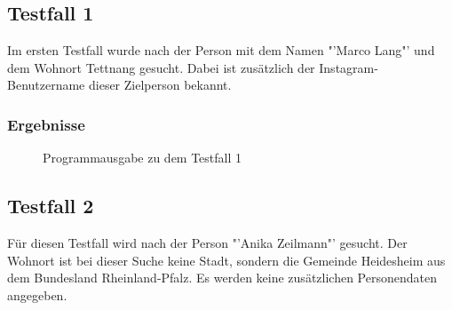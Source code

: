 	\subsection{Testfall 1}
	\label{subsec:Testfall1}
	Im ersten Testfall wurde nach der Person mit dem Namen "'Marco Lang"' und dem Wohnort Tettnang gesucht. Dabei ist zusätzlich der Instagram-Benutzername dieser Zielperson bekannt.
	\subsubsection{Ergebnisse}
		\begin{figure}[h!]
			\caption{Programmausgabe zu dem Testfall 1}
		\end{figure}
		\FloatBarrier
	\subsection{Testfall 2}
	\label{subsec:Testfall2}
	Für diesen Testfall wird nach der Person "'Anika Zeilmann"' gesucht. Der Wohnort ist bei dieser Suche keine Stadt, sondern die Gemeinde Heidesheim aus dem Bundesland Rheinland-Pfalz. Es werden keine zusätzlichen Personendaten angegeben.
